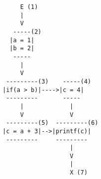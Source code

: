 \begin{minipage}[t]{2in}
\begin{Verbatim}
     E (1)
     |
     V
   -----(2)
  |a = 1|
  |b = 2|
   -----
     |
     V
 ---------(3)    -----(4)
|if(a > b)|---->|c = 4|
 ---------       -----
     |             |
     V             V
 ---------(5)  ---------(6)
|c = a + 3|-->|printf(c)|
 ---------     ---------
                   |
                   V
                   |
                   X (7)
\end{Verbatim}
\end{minipage}





